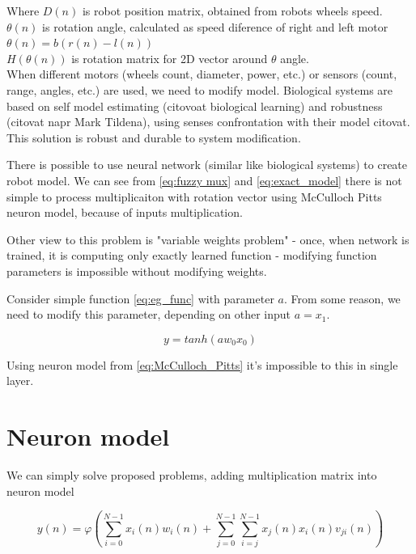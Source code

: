 \documentclass[times]{cpeauth}
\begin{document}
Where
$D(n)$ is robot position matrix, obtained from robots wheels speed. \\
$\theta(n)$ is rotation angle, calculated as speed diference of right and left motor $\theta(n) = b(r(n) - l(n))$ \\
$H(\theta(n))$ is rotation matrix for 2D vector around $\theta$ angle. \\
When different motors (wheels count, diameter, power, etc.) or sensors (count, range, angles, etc.) are used, we need to modify model. Biological systems are based on self model estimating (citovoat biological learning) and robustness (citovat napr Mark Tildena), using senses confrontation with their model citovat. This solution is robust and durable to system modification.

There is possible to use neural network (similar like biological systems) to create robot model.
We can see from \ref{eq:fuzzy mux} and \ref{eq:exact_model} there is not simple to process multiplicaiton
 with rotation vector using McCulloch Pitts neuron model, because of inputs multiplication.

Other view to this problem is "variable weights problem" - once, when network is
trained, it is computing only exactly learned function - modifying function parameters
is impossible without modifying weights.

Consider simple function \ref{eq:eg_func} with parameter $a$. From some reason,
we need to modify this parameter, depending on other input $a = x_1$.

\begin{equation}
\label{eq:eg_func}
  y = tanh(aw_0x_0)
\end{equation}

Using neuron model from \ref{eq:McCulloch_Pitts} it's impossible to this in single layer.









\section{Neuron model}

We can simply solve proposed problems, adding multiplication matrix into neuron model

\begin{equation}
\label{eq:testing_neuron_1}
  y(n) = \varphi(\sum_{i = 0}^{N-1} x_i(n)w_i(n) + \sum_{j = 0}^{N-1} \sum_{i = j}^{N-1} x_j(n)x_i(n)v_{ji}(n))
\end{equation}
\end{document}
